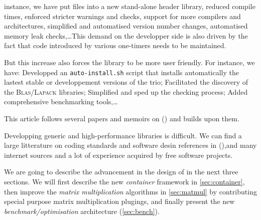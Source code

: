 instance, we have put \fflas files into a new stand-alone \fflas header
library, reduced compile times, enforced stricter warnings and checks, support
for more compilers and architectures, simplified and automatised version number
changes, automatised memory leak checks,\dots This demand on the developper
side is also driven by the fact that code introduced by various one-timers
needs to be maintained.
%
\par
%
But this increase also forces the library to be more user friendly. For
instance, we have: Developped an \texttt{auto-install.sh} script that installs
automatically the lastest stable or developpement versions of the trio;
Facilitated the discovery of the \textsc{Blas}/\textsc{Lapack} libraries;
Simplified and sped up the checking process; Added comprehensive benchmarking tools,\dots
%
\par
%
This article follows several papers and memoirs on \linbox
(\cite{Giorgi:2004:these,Turner:2002:these,Boyer:12,Dumas:2002:icms,Dumas:2010:lbpar})
and builds upon them.
%
\par
%
Developping generic and high-performance libraries is difficult. We can find a
large litterature on coding standards and software desin references in
(\cite{alexandrescu:01:modern, gamma:95:design, sutter:05:cpp,
stroustrup1994design,Douglas:05:GPHP}),and  many internet sources and a lot of
experience acquired by free software projects.
%
\par
%
We are going to describe the advancement in the design of \linbox in the next
three sections. We will first describe the new \emph{container} framework in
\cref{sec:container}, then improve the \emph{matrix multiplication} algorithms
in \cref{sec:matmul} by contributing special purpose matrix multiplication
plugings, and finally present the new \emph{benchmark/optimisation}
architecture (\cref{sec:bench}).

